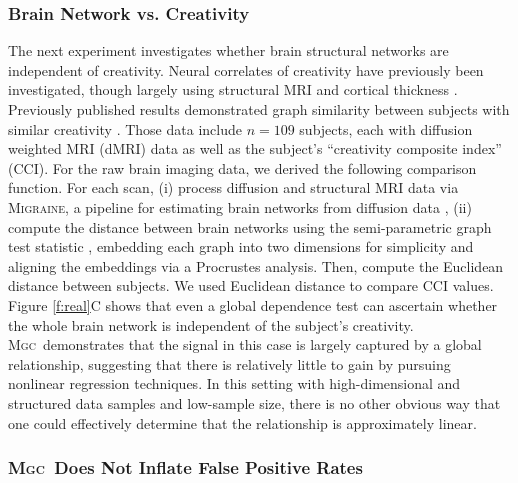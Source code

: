 \documentclass[11pt]{article}
\providecommand{\sct}[1]{{\normalfont\textsc{#1}}}
\newcommand{\Migraine}{\sct{Migraine}}
\newcommand{\Mgc}{\sct{Mgc}}
\begin{document}
\subsubsection*{Brain Network vs. Creativity}

The next experiment investigates whether brain structural networks are independent of creativity.  Neural correlates of creativity have previously been investigated, though largely using structural MRI and cortical thickness \cite{Jung2009}.  Previously published results demonstrated graph similarity between subjects with similar creativity \cite{Koutra15a}. Those data include  $n=109$ subjects, each with diffusion weighted MRI (dMRI) data as well as the subject's ``creativity composite index'' (CCI).  
For the raw brain imaging data, we derived the following comparison function.  For each scan, (i) process diffusion and structural MRI data via  \Migraine, a pipeline for estimating brain networks from diffusion data \cite{GrayRoncal2013}, (ii) 
compute the distance between brain networks using the semi-parametric graph test statistic \cite{Sussman2013,ShenVogelsteinPriebe2016,Tang2016}, embedding each graph into two dimensions for simplicity and aligning the embeddings via a Procrustes analysis.  Then, compute the Euclidean distance between subjects. We used Euclidean distance to compare CCI values. 
% 
Figure \ref{f:real}{\color{magenta}C} shows that even a global dependence test can ascertain whether the whole brain network is independent of the subject's creativity.  \Mgc~demonstrates that the signal in this case is largely captured by a global relationship, suggesting that there is relatively little to gain by pursuing nonlinear regression techniques. In this setting with high-dimensional and structured data samples and low-sample size, there is no other obvious way that one could effectively determine that the relationship is approximately linear.


\subsubsection*{\Mgc~Does Not Inflate False Positive Rates} 
\end{document}
